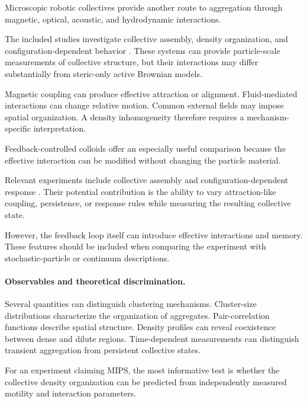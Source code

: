 Microscopic robotic collectives provide
another route to aggregation through
magnetic, optical, acoustic, and
hydrodynamic interactions.

The included studies investigate
collective assembly, density organization,
and configuration-dependent behavior
\cite{Calabr2026interactiondrivena,Rivas2023spatialpatterningo,Yang2022emergentmicroroboti,Aubret2018targetedassemblyan,Yan2024programmingstructur,Yigit2020cohesiveselforgani,Hanson2025electrokineticpropu,Ceron2023programmableselfor}.
These systems can provide particle-scale
measurements of collective structure,
but their interactions may differ
substantially from steric-only
active Brownian models.

Magnetic coupling can produce
effective attraction or alignment.
Fluid-mediated interactions can
change relative motion.
Common external fields may impose
spatial organization. A density
inhomogeneity therefore requires
a mechanism-specific interpretation.

Feedback-controlled colloids offer
an especially useful comparison
because the effective interaction
can be modified without changing
the particle material.

Relevant experiments include
collective assembly and
configuration-dependent response
\cite{Yan2014colloidalsuperstruc,Buerle2020formationofstable,Knippenberg2022roleofcohesionin,Lffler2021behaviordependentc,Chen2024persistentandrespo,Guo2026afeedbackcontrolle}.
Their potential contribution is the
ability to vary attraction-like
coupling, persistence, or response
rules while measuring the resulting
collective state.

However, the feedback loop itself
can introduce effective interactions
and memory. These features should
be included when comparing the
experiment with stochastic-particle
or continuum descriptions.

\paragraph*{Observables and theoretical discrimination.}

Several quantities can distinguish
clustering mechanisms. Cluster-size
distributions characterize the
organization of aggregates.
Pair-correlation functions describe
spatial structure. Density profiles
can reveal coexistence between
dense and dilute regions.
Time-dependent measurements
can distinguish transient
aggregation from persistent
collective states.

For an experiment claiming MIPS,
the most informative test is
whether the collective density
organization can be predicted
from independently measured
motility and interaction
parameters.

